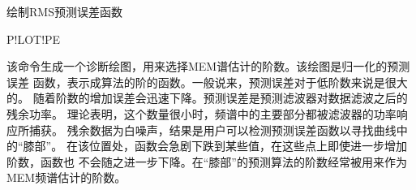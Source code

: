 \label{spe:plotpe}

绘制RMS预测误差函数

\begin{SACSTX}
P!LOT!PE
\end{SACSTX}

该命令生成一个诊断绘图，用来选择MEM谱估计的阶数。该绘图是归一化的预测误差
函数，表示成算法的阶的函数。一般说来，预测误差对于低阶数来说是很大的。
随着阶数的增加误差会迅速下降。预测误差是预测滤波器对数据滤波之后的残余功率。
理论表明，这个数量很小时，频谱中的主要部分都被滤波器的功率响应所捕获。
残余数据为白噪声，结果是用户可以检测预测误差函数以寻找曲线中的“膝部”。
在该位置处，函数会急剧下跌到某些值，在这些点上即使进一步增加阶数，函数也
不会随之进一步下降。在``膝部''的预测算法的阶数经常被用来作为MEM频谱估计的阶数。
